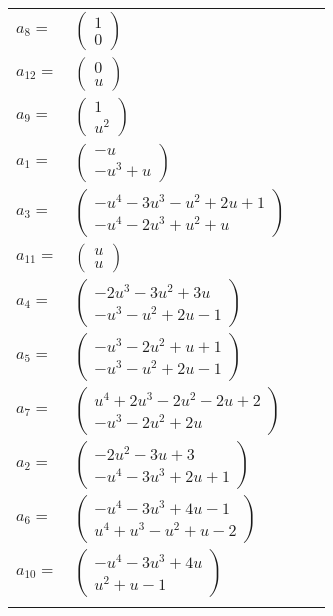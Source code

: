 \documentclass[1p]{elsarticle_modified}
\theoremstyle{definition}
\begin{document}
\begin{tabular}{m{7pt} m{180pt} m{7pt} m{180pt} }
\flushright $a_{8}=$&$\begin{pmatrix}1\\0\end{pmatrix}$ \\
\flushright $a_{12}=$&$\begin{pmatrix}0\\u\end{pmatrix}$ \\
\flushright $a_{9}=$&$\begin{pmatrix}1\\u^2\end{pmatrix}$ \\
\flushright $a_{1}=$&$\begin{pmatrix}- u\\- u^3+u\end{pmatrix}$ \\
\flushright $a_{3}=$&$\begin{pmatrix}- u^4-3 u^3- u^2+2 u+1\\- u^4-2 u^3+u^2+u\end{pmatrix}$ \\
\flushright $a_{11}=$&$\begin{pmatrix}u\\u\end{pmatrix}$ \\
\flushright $a_{4}=$&$\begin{pmatrix}-2 u^3-3 u^2+3 u\\- u^3- u^2+2 u-1\end{pmatrix}$ \\
\flushright $a_{5}=$&$\begin{pmatrix}- u^3-2 u^2+u+1\\- u^3- u^2+2 u-1\end{pmatrix}$ \\
\flushright $a_{7}=$&$\begin{pmatrix}u^4+2 u^3-2 u^2-2 u+2\\- u^3-2 u^2+2 u\end{pmatrix}$ \\
\flushright $a_{2}=$&$\begin{pmatrix}-2 u^2-3 u+3\\- u^4-3 u^3+2 u+1\end{pmatrix}$ \\
\flushright $a_{6}=$&$\begin{pmatrix}- u^4-3 u^3+4 u-1\\u^4+u^3- u^2+u-2\end{pmatrix}$ \\
\flushright $a_{10}=$&$\begin{pmatrix}- u^4-3 u^3+4 u\\u^2+u-1\end{pmatrix}$\\&\end{tabular}
\end{document}
